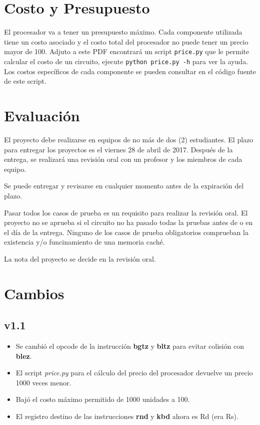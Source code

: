 \documentclass[letterpaper,11pt]{scrartcl}
\begin{document}
\section*{Costo y Presupuesto}
  
  El procesador va a tener un presupuesto máximo. Cada componente utilizada tiene un
  costo asociado y el costo total del procesador no puede tener un precio mayor de 100.
  Adjuto a este PDF encontrará un script \verb|price.py| que le permite calcular el costo de un circuito, 
  ejecute \verb|python price.py -h| para ver la ayuda. Los costos específicos de cada componente se pueden 
  consultar en el código fuente de este script.
  
\section*{Evaluación}
  
  El proyecto debe realizarse en equipos de no más de dos (2) estudiantes. El
  plazo para entregar los proyectos es el viernes 28 de abril de 2017. Después de
  la entrega, se realizará una revisión oral con un profesor y los miembros de
  cada equipo.

  Se puede entregar y revisarse en cualquier momento antes de la expiración del plazo.

  Pasar todos los casos de prueba es un requisito para realizar la revisión oral.
  El proyecto no se aprueba si el circuito no ha pasado todas la pruebas antes de o en el día de la entrega. 
  Ninguno de los casos de prueba obligatorios comprueban la existencia y/o funcinamiento de una memoria caché.

  La nota del proyecto se decide en la revisión oral. 

\section*{Cambios}

\subsection*{v1.1}
  \begin{itemize}
    \item Se cambió el opcode de la instrucción \textbf{bgtz} y \textbf{bltz} para evitar colisión con \textbf{blez}. 
    \item El script \textit{price.py} para el cálculo del precio del procesador devuelve un precio 1000 veces menor.
    \item Bajó el costo máximo permitido de 1000 unidades a 100.
    \item El registro destino de las instrucciones \textbf{rnd} y \textbf{kbd} ahora es Rd (era Rs).
  \end{itemize}
\end{document}
